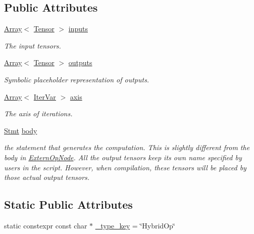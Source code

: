 \subsection*{Public Attributes}
\begin{DoxyCompactItemize}
\item 
\hyperlink{classtvm_1_1Array}{Array}$<$ \hyperlink{classtvm_1_1te_1_1Tensor}{Tensor} $>$ \hyperlink{classtvm_1_1te_1_1HybridOpNode_a45104e4a1d31714b9eac76510d33fda5}{inputs}
\begin{DoxyCompactList}\small\item\em The input tensors. \end{DoxyCompactList}\item 
\hyperlink{classtvm_1_1Array}{Array}$<$ \hyperlink{classtvm_1_1te_1_1Tensor}{Tensor} $>$ \hyperlink{classtvm_1_1te_1_1HybridOpNode_a6ff8e6faa8d01063e32a2c124721df29}{outputs}
\begin{DoxyCompactList}\small\item\em Symbolic placeholder representation of outputs. \end{DoxyCompactList}\item 
\hyperlink{classtvm_1_1Array}{Array}$<$ \hyperlink{classtvm_1_1tir_1_1IterVar}{Iter\+Var} $>$ \hyperlink{classtvm_1_1te_1_1HybridOpNode_ac4fae56982073412415765d9016c3dbd}{axis}
\begin{DoxyCompactList}\small\item\em The axis of iterations. \end{DoxyCompactList}\item 
\hyperlink{classtvm_1_1tir_1_1Stmt}{Stmt} \hyperlink{classtvm_1_1te_1_1HybridOpNode_a77124ad0787c8325f9ba556acdb62feb}{body}
\begin{DoxyCompactList}\small\item\em the statement that generates the computation. This is slightly different from the body in \hyperlink{classtvm_1_1te_1_1ExternOpNode}{Extern\+Op\+Node}. All the output tensors keep its own name specified by users in the script. However, when compilation, these tensors will be placed by those actual output tensors. \end{DoxyCompactList}\end{DoxyCompactItemize}
\subsection*{Static Public Attributes}
\begin{DoxyCompactItemize}
\item 
static constexpr const char $\ast$ \hyperlink{classtvm_1_1te_1_1HybridOpNode_a6c61dae889fbe0d6d69f9f168e9271e9}{\+\_\+type\+\_\+key} = \char`\"{}Hybrid\+Op\char`\"{}
\end{DoxyCompactItemize}


